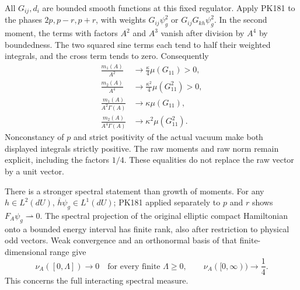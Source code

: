 \documentclass[11pt]{article}
\begin{document}
All \(G_{ij},d_i\) are bounded smooth functions at this fixed
regulator. Apply PK181 to the phases \(2p,p-r,p+r\), with
weights \(G_{ij}\psi_g^2\) or \(G_{ij}G_{kh}\psi_g^2\).
In the second moment, the terms with factors \(A^2\) and \(A^3\)
vanish after division by \(A^4\) by boundedness. The two squared
sine terms each tend to half their weighted integrals, and the
cross term tends to zero. Consequently
\[
 \begin{split}
 \frac{m_1(A)}{A^2}&\longrightarrow
                  \frac{\kappa}{4}\mu(G_{11})>0,\\
 \frac{m_2(A)}{A^4}&\longrightarrow
                  \frac{\kappa^2}{4}\mu(G_{11}^2)>0,\\
 \frac{m_1(A)}{A^2\Gamma(A)}&\longrightarrow\kappa\mu(G_{11}),\\
 \frac{m_2(A)}{A^4\Gamma(A)}&\longrightarrow\kappa^2\mu(G_{11}^2).
 \end{split}\tag{PK186}
\]
Nonconstancy of \(p\) and strict positivity of the actual vacuum
make both displayed integrals strictly positive. The raw moments
and raw norm remain explicit, including the factors \(1/4\).
These equalities do not replace the raw vector by a unit vector.

There is a stronger spectral statement than growth of moments.
For any \(h\in L^2(dU)\), \(\overline h\psi_g\in L^1(dU)\);
PK181 applied separately to \(p\) and \(r\) shows
\(F_A\psi_g\rightharpoonup0\).
The spectral projection of the original elliptic compact
Hamiltonian onto a bounded energy interval has finite rank, also
after restriction to physical odd vectors. Weak convergence and
an orthonormal basis of that finite-dimensional range give
\[
 \nu_A([0,\Lambda])\longrightarrow0
 \quad\text{for every finite }\Lambda\ge0,\qquad
 \nu_A([0,\infty))\longrightarrow\frac14 .
 \tag{PK187}
\]
This concerns the full interacting spectral measure.
\end{document}

